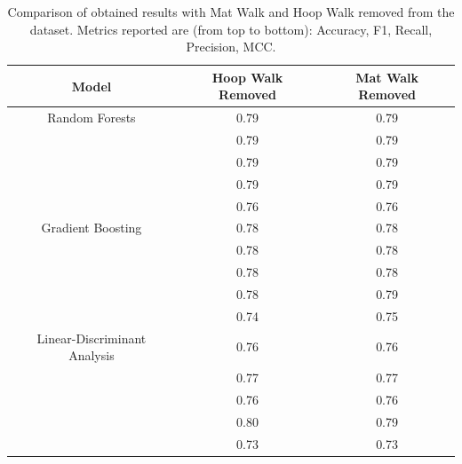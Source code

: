                 \begin{table}[htbp]
                    \centering
                    \caption{Comparison of obtained results with Mat Walk and Hoop Walk removed from the dataset. Metrics reported are (from top to bottom): Accuracy, F1, Recall, Precision, MCC.}
                    \label{tab:correct_approach_mat_hoop} 
                    \begin{tabular}{|c|c|c|}
                    \hline
                    \textbf{Model} & \textbf{Hoop Walk Removed} & \textbf{Mat Walk Removed} \\ \hline
                        Random Forests                   & 0.79 & 0.79 \\ 
                                                        & 0.79 & 0.79 \\ 
                                                        & 0.79 & 0.79 \\ 
                                                        & 0.79 & 0.79 \\
                                                        & 0.76 & 0.76 \\ 
                                                        \hline
                        Gradient Boosting               & 0.78 & 0.78 \\ 
                                                        & 0.78 & 0.78 \\ 
                                                        & 0.78 & 0.78 \\ 
                                                        & 0.78 & 0.79 \\
                                                        & 0.74 & 0.75 \\
                                                        \hline
                        Linear-Discriminant Analysis    & 0.76 & 0.76 \\ 
                                                        & 0.77 & 0.77 \\ 
                                                        & 0.76 & 0.76 \\
                                                        & 0.80 & 0.79 \\ 
                                                        & 0.73 & 0.73 \\ 
                                                        \hline
                    \end{tabular}
                \end{table}
           \newpage 

